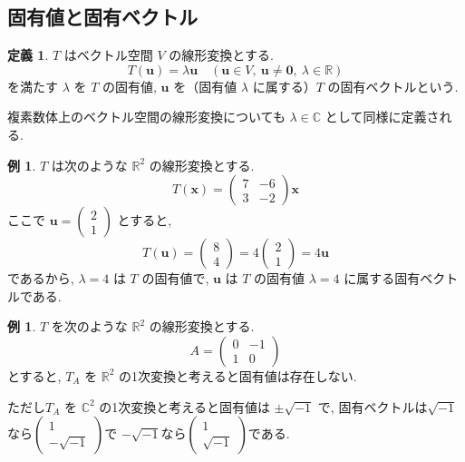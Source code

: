 \documentclass[dvipdfmx,a4paper,11pt]{article} %
\theoremstyle{definition}
\newtheorem{defn}[thm]{定義}
\newtheorem{ex}[thm]{例}
\begin{document}
\subsection{固有値と固有ベクトル \cite[5.3節]{M}}

\begin{defn}
$T$ はベクトル空間 $V$ の線形変換とする.
\[
T(\bm{u})=\lambda \bm{u}
\quad(\bm{u}\in V,\ \bm{u}\neq\bm{0},\ \lambda\in\mathbb{R})
\]
を満たす $\lambda$ を $T$ の固有値, $\bm{u}$ を（固有値 $\lambda$ に属する）$T$ の固有ベクトルという.
\end{defn}
複素数体上のベクトル空間の線形変換についても $\lambda\in\mathbb{C}$ として同様に定義される.
\begin{ex}%
$T$ は次のような $\mathbb{R}^2$ の線形変換とする.
\[
T(\bm{x})=
\begin{pmatrix}
7&-6\\
3&-2
\end{pmatrix}
\bm{x}
\]
ここで
\(
\bm{u}=
\begin{pmatrix}
2\\
1
\end{pmatrix}
\)
とすると,
\[
T(\bm{u})=
\begin{pmatrix}
8\\
4
\end{pmatrix}
=
4
\begin{pmatrix}
2\\
1
\end{pmatrix}
=4\bm{u}
\]
であるから, $\lambda=4$ は $T$ の固有値で, $\bm{u}$ は $T$ の固有値 $\lambda=4$ に属する固有ベクトルである.
\end{ex}
\begin{ex}
$T$ を次のような $\mathbb{R}^2$ の線形変換とする.
\[
A=
\begin{pmatrix}
0&-1\\
1&0
\end{pmatrix}
\]
とすると, $T_A$ を $\mathbb{R}^2$ の1次変換と考えると固有値は存在しない. 

ただし$T_A$ を $\mathbb{C}^2$ の1次変換と考えると固有値は $\pm\sqrt{-1}$ で, 
固有ベクトルは$\sqrt{-1}$なら$\begin{pmatrix}
1\\
-\sqrt{-1}
\end{pmatrix}$で
$-\sqrt{-1}$なら$\begin{pmatrix}
1\\
\sqrt{-1}
\end{pmatrix}$である. 
\end{ex}
\end{document}
